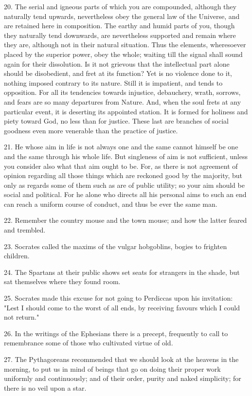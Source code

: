 \documentclass{book}
\begin{document}
20. The serial and igneous parts of which you are compounded, although
they naturally tend upwards, nevertheless obey the general law of the
Universe, and are retained here in composition. The earthy and humid
parts of you, though they naturally tend downwards, are nevertheless
supported and remain where they are, although not in their natural
situation. Thus the elements, wheresoever placed by the superior
power, obey the whole; waiting till the signal shall sound again for
their dissolution. Is it not grievous that the intellectual part alone
should be disobedient, and fret at its function? Yet is no violence
done to it, nothing imposed contrary to its nature. Still it is
impatient, and tends to opposition. For all its tendencies towards
injustice, debauchery, wrath, sorrows, and fears are so many
departures from Nature. And, when the soul frets at any particular
event, it is deserting its appointed station. It is formed for
holiness and piety toward God, no less than for justice. These last
are branches of social goodness even more venerable than the practice
of justice.

21. He whose aim in life is not always one and the same cannot himself
be one and the same through his whole life. But singleness of aim is
not sufficient, unless you consider also what that aim ought to
be. For, as there is not agreement of opinion regarding all those
things which are reckoned good by the majority, but only as regards
some of them such as are of public utility; so your aim should be
social and political. For he alone who directs all his personal aims
to such an end can reach a uniform course of conduct, and thus be ever
the same man.

22. Remember the country mouse and the town mouse; and how the latter
feared and trembled.

23. Socrates called the maxims of the vulgar hobgoblins, bogies to
frighten children.

24. The Spartans at their public shows set seats for strangers in the
shade, but sat themselves where they found room.

25. Socrates made this excuse for not going to Perdiccas upon his
invitation: "Lest I should come to the worst of all ends, by receiving
favours which I could not return."

26. In the writings of the Ephesians there is a precept, frequently to
call to remembrance some of those who cultivated virtue of old.

27. The Pythagoreans recommended that we should look at the heavens in
the morning, to put us in mind of beings that go on doing their proper
work uniformly and continuously; and of their order, purity and naked
simplicity; for there is no veil upon a star.
\end{document}
